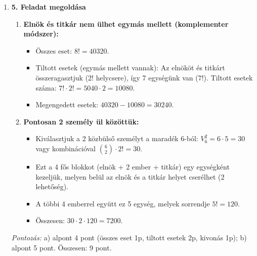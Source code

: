 \documentclass[12pt,a4paper]{article}
\begin{document}
\begin{enumerate}[label=\arabic*., leftmargin=*]
    \vspace{0.4cm}

    \item \textbf{5. Feladat megoldása}
    \begin{enumerate}[label=\alph*)]
        \item \textbf{Elnök és titkár nem ülhet egymás mellett (komplementer módszer):}
        \begin{itemize}
            \item Összes eset: $8! = 40320$.
            \item Tiltott esetek (egymás mellett vannak): Az elnököt és titkárt összeragasztjuk (2! helycsere), így 7 egységünk van ($7!$). Tiltott esetek száma: $7! \cdot 2! = 5040 \cdot 2 = 10080$.
            \item Megengedett esetek: $40320 - 10080 = 30240$.
        \end{itemize}
        \item \textbf{Pontosan 2 személy ül közöttük:}
        \begin{itemize}
            \item Kiválasztjuk a 2 közbülső személyt a maradék 6-ból: $V_6^2 = 6 \cdot 5 = 30$ vagy kombinációval $ \binom{6}{2} \cdot 2! = 30 $.
            \item Ezt a 4 fős blokkot (elnök + 2 ember + titkár) egy egységként kezeljük, melyen belül az elnök és a titkár helyet cserélhet (2 lehetőség).
            \item A többi 4 emberrel együtt ez 5 egység, melyek sorrendje $5! = 120$.
            \item Összesen: $30 \cdot 2 \cdot 120 = 7200$.
        \end{itemize}
    \end{enumerate}
    \textit{Pontozás:} a) alpont 4 pont (összes eset 1p, tiltott esetek 2p, kivonás 1p); b) alpont 5 pont. Összesen: 9 pont.

    \vspace{0.4cm}


\end{enumerate}
\end{document}
